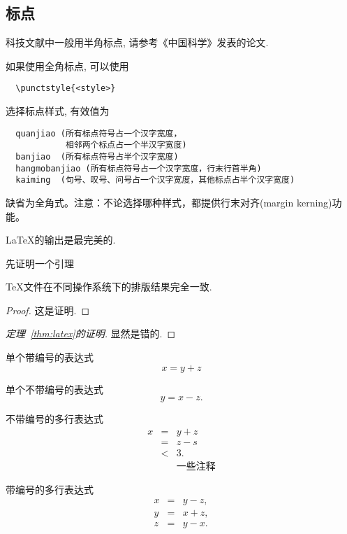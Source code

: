 \documentclass[12pt,openright]{book}
\begin{document}
\subsection{标点}
科技文献中一般用半角标点, 请参考《中国科学》发表的论文.

如果使用全角标点, 可以使用
\begin{verbatim}
  \punctstyle{<style>}
\end{verbatim}
选择标点样式, 有效值为
\begin{verbatim}
  quanjiao (所有标点符号占一个汉字宽度，
            相邻两个标点占一个半汉字宽度)
  banjiao  (所有标点符号占半个汉字宽度)
  hangmobanjiao (所有标点符号占一个汉字宽度，行末行首半角)
  kaiming  (句号、叹号、问号占一个汉字宽度，其他标点占半个汉字宽度)
\end{verbatim}
缺省为全角式。注意：不论选择哪种样式，都提供行末对齐(margin kerning)功能。



\begin{Theorem} \label{thm:latex}
\LaTeX 的输出是最完美的.
\end{Theorem}

先证明一个引理
\begin{Lemma} \label{thm:tex}
\TeX 文件在不同操作系统下的排版结果完全一致.
\end{Lemma}

\begin{proof}
这是证明.
\end{proof}


\begin{proof}[定理~\ref{thm:latex}的证明]
显然是错的.
\end{proof}

单个带编号的表达式
\begin{equation}\label{eq:a1}
x=y+z
\end{equation}

单个不带编号的表达式
\[
y=x-z.
\]

不带编号的多行表达式
\begin{eqnarray*}
x&=&y+z \\
 &=&z-s\\
 &<& 3. \\
 && \mbox{一些注释}
\end{eqnarray*}

带编号的多行表达式
\begin{eqnarray}
 x&=& y-z, \label{eq:aa1}\\
 y&=& x+z, \nonumber \\
 z&=&y-x. \label{eq:aa2}
\end{eqnarray}
\end{document}
